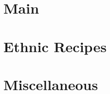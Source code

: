 \documentclass[11pt]{memoir} %
\begin{document}

\part{Main}

















\part{Ethnic Recipes}






%

\part{Miscellaneous}


\printindex
\end{document}
